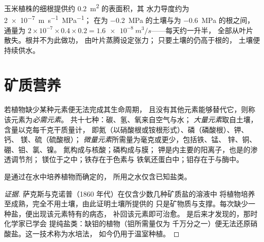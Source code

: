 \begin{example}[每天一升]\label{ex:b1:plant-water-minerals:litre}
玉米植株的细根提供约 \qty{0.2}{m^2} 的表面积，其
水力导度约为 \qty{2e-7}{m.s^{-1}.MPa^{-1}}；
在为 \qty{-0.2}{MPa} 的土壤与为 \qty{-0.6}{MPa} 的根之间，通量为
$2\times 10^{-7}\times 0.4\times 0.2 = \qty{1.6e-8}{m^3/s}$——每天约一升半，
全部从叶片散失。根并不为此做功，
由叶片蒸腾设定张力；
只要土壤的仍高于根的，
土壤便持续供水。
\end{example}

\section{矿质营养}

\begin{definition}[必需元素]\label{def:b1:plant-water-minerals:elements}
若植物缺少某种元素便无法完成其生命周期，
且没有其他元素能够替代它，则称该元素为\emph{必需元素}。
共十七种：碳、氢、氧来自空气与水；
\emph{大量元素}取自土壤，含量以克每千克干质量计，
即氮（以硝酸根或铵根形式）、磷（磷酸根）、钾、钙、
镁、硫（硫酸根）；
\emph{微量元素}所需量为毫克或更少，包括铁、锰、
锌、铜、硼、钼、氯、镍。
氮构成与核酸；磷构成与膜；
钾是内主要的阳离子，也是的渗透调节剂；
镁位于之中；铁存在于色素与
铁氧还蛋白中；钼存在于与酶中。
\end{definition}

\begin{proposition}[必需元素如何确定]\label{prop:b1:plant-water-minerals:hydroponics}
是通过在水中培养植物而确定的，
所用之水仅含已知盐类。
\end{proposition}
\begin{proof}[证据]
萨克斯与克诺普（1860 年代）在仅含少数几种矿质盐的溶液中
将植物培养至成熟，完全不用土壤，由此证明土壤所提供的
只是矿物质与支撑。每次缺少一种盐，便出现该元素特有的病态，
补回该元素即可治愈。
是后来才发现的，那时化学家已学会
提纯盐类：缺钼的植物（钼所需量仅为
千万分之一）便无法还原硝酸盐。这一技术称为水培法，
如今仍用于温室种植。
\end{proof}


